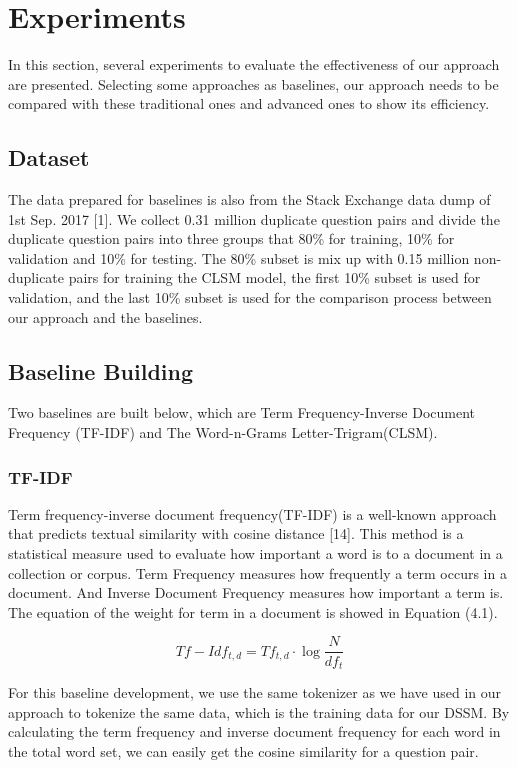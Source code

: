 	\chapter{Experiments}
	In this section, several experiments to evaluate the effectiveness of our approach are presented. Selecting some approaches as baselines, our approach needs to be compared with these traditional ones and advanced ones to show its efficiency.
	\section{Dataset}
	The data prepared for baselines is also from the Stack Exchange data dump of 1st Sep. 2017 [1]. We collect 0.31 million duplicate question pairs and divide the duplicate question pairs into three groups that 80\% for training, 10\% for validation and 10\% for testing. The 80\% subset is mix up with 0.15 million non-duplicate pairs for training the CLSM model, the first 10\% subset is used for validation, and the last 10\% subset is used for the comparison process between our approach and the baselines.
	\section{Baseline Building}
	Two baselines are built below, which are Term Frequency-Inverse Document Frequency (TF-IDF) and The Word-n-Grams Letter-Trigram(CLSM).
	
	\subsection{TF-IDF}
	Term frequency-inverse document frequency(TF-IDF) is a well-known approach that predicts textual similarity with cosine distance [14]. This method is a statistical measure used to evaluate how important a word is to a document in a collection or corpus. Term Frequency measures how frequently a term occurs in a document. And Inverse Document Frequency measures how important a term is. The equation of the weight for term in a document is showed in Equation (4.1).\par
	\begin{normalsize}
		\begin{equation}
		Tf-Idf_{t,d} = Tf_{t,d} \cdot \log \frac{N}{df_t}
		\end{equation}
	\end{normalsize}
	For this baseline development, we use the same tokenizer as we have used in our approach to tokenize the same data, which is the training data for our DSSM. By calculating the term frequency and inverse document frequency for each word in the total word set, we can easily get the cosine similarity for a question pair.

